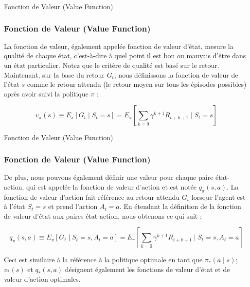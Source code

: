 \documentclass[serif, aspectratio=169]{beamer}
\begin{document}
\begin{frame}{Fonction de Valeur (Value Function)}
	\frametitle{Fonction de Valeur (Value Function)}
	
	La fonction de valeur, également appelée fonction de valeur d'état, mesure la qualité de chaque état, c'est-à-dire à quel point il est bon ou mauvais d'être dans un état particulier. Notez que le critère de qualité est basé sur le retour. Maintenant, sur la base du retour \( G_t \), nous définissons la fonction de valeur de l'état \( s \) comme le retour attendu (le retour moyen sur tous les épisodes possibles) après avoir suivi la politique \( \pi \) :
	
	\vspace{10pt}
	
	\[
	v_\pi(s) \equiv E_\pi[G_t \mid S_t = s] = E_\pi\left[\sum_{k=0} \gamma^{k+1} R_{t+k+1} \mid S_t = s\right]
	\]
	
\end{frame}


\begin{frame}{Fonction de Valeur (Value Function)}
	\frametitle{Fonction de Valeur (Value Function)}
	
	De plus, nous pouvons également définir une valeur pour chaque paire état-action, qui est appelée la fonction de valeur d'action et est notée \( q_\pi(s, a) \). La fonction de valeur d'action fait référence au retour attendu \( G_t \) lorsque l'agent est à l'état \( S_t = s \) et prend l'action \( A_t = a \). En étendant la définition de la fonction de valeur d'état aux paires état-action, nous obtenons ce qui suit :
	
	\[
	q_\pi(s, a) \equiv E_\pi[G_t \mid S_t = s, A_t = a] = E_\pi\left[\sum_{k=0} \gamma^{k+1} R_{t+k+1} \mid S_t = s, A_t = a\right]
	\]
	
	Ceci est similaire à la référence à la politique optimale en tant que \( \pi_*(a \mid s) \); \( v_*(s) \) et \( q_*(s, a) \) désignent également les fonctions de valeur d'état et de valeur d'action optimales.
	
\end{frame}
\end{document}
